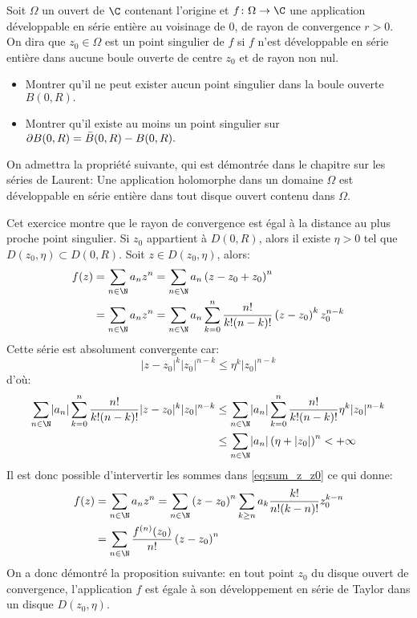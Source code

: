 \begin{fex}
    Soit $\Omega$ un ouvert de $\C$ contenant l'origine et $f \colon \Omega \to \C$ une application développable en
    série entière au voisinage de $0$, de rayon de convergence $r > 0$. On dira que $z_0 \in \Omega$ est un point singulier de $f$ si $f$ n'est développable en série entière dans aucune boule ouverte de centre $z_0$ et de rayon non nul.
    \begin{itemize}
        \item Montrer qu'il ne peut exister aucun point singulier dans la boule ouverte $B(0,R).$
        \item Montrer qu'il existe au moins un point singulier sur $\partial B(0,R) = \Bar{B}(0,R)-B(0,R).$
    \end{itemize}
    On admettra la propriété suivante, qui est démontrée dans le chapitre sur les séries de Laurent: Une application holomorphe dans un domaine $\Omega$ est développable en série entière dans tout disque ouvert contenu dans $\Omega.$
\end{fex}
Cet exercice montre que le rayon de convergence est égal à la distance au plus proche point singulier. 
Si $z_0$ appartient à $D(0,R)$, alors il existe $\eta > 0$ tel que $D(z_0,\eta) \subset D(0,R).$ Soit $z \in D(z_0,\eta)$, alors:
\begin{equation}
\label{eq:sum_z_z0}
\begin{split}
f(z) & = \sum_{n\in \N} a_n z^n = \sum_{n \in \N} a_n \left(
z-z_0 + z_0
\right)^n \\
& = \sum_{n\in \N} a_n z^n = \sum_{n \in \N} a_n \sum_{k=0}^n
\frac{n!}{k!(n-k)!} \left( z-z_0 \right)^k z_0^{n-k}
\end{split}
\end{equation}
Cette série est absolument convergente car:
\[
\lvert z-z_0 \rvert ^k \lvert z_0 \rvert^{n-k} \leq \eta^k \lvert z_0 \rvert^{n-k}
\]
d'où:
\[
\begin{split}
\sum_{n \in \N} \lvert  a_n \rvert \sum_{k=0}^n
\frac{n!}{k!(n-k)!} \lvert z-z_0 \rvert^k \lvert z_0\rvert ^{n-k} 
& \leq \sum_{n \in \N} \lvert  a_n \rvert \sum_{k=0}^n
\frac{n!}{k!(n-k)!} \eta^k \lvert z_0 \rvert^{n-k}\\
& \leq \sum_{n \in \N} \lvert  a_n \rvert \left( \eta + \lvert z_0 \rvert \right)^n < +\infty
\end{split}
\]
Il est donc possible d'intervertir les sommes dans \ref{eq:sum_z_z0} ce qui donne:
\begin{equation}
\begin{split}
 f(z) & = \sum_{n\in \N} a_n z^n = \sum_{n \in \N} \left(z-z_0\right)^n \sum_{k \geq n} a_k \frac{k!}{n! (k-n)!}z_0^{k-n} \\ 
  & = \sum_{n \in \N} \frac{f^{(n)}(z_0)}{n!} \left(z-z_0\right)^n
  \end{split}
\end{equation}
On a donc démontré la proposition suivante: en tout point $z_0$ du disque ouvert de convergence, l'application $f$ est égale à son développement en série de Taylor dans un disque $D(z_0,\eta).$

